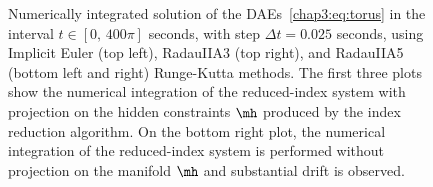 \begin{figure}
  \centering
  \caption{Numerically integrated solution of the \acp{DAE}~\eqref{chap3:eq:torus} in the interval $t \in [0, \, 400\pi]$ seconds, with step $\Delta t = 0.025$ seconds, using Implicit Euler (top left), RadauIIA3 (top right), and RadauIIA5 (bottom left and right) Runge-Kutta methods. The first three plots show the numerical integration of the reduced-index system with projection on the hidden constraints $\mh$ produced by the index reduction algorithm. On the bottom right plot, the numerical integration of the reduced-index system is performed without projection on the manifold $\mh$ and substantial drift is observed.}
  \label{chap3:fig:torus_integration}
\end{figure}

